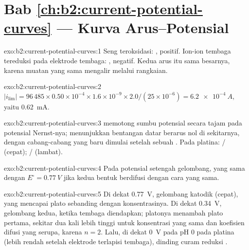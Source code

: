 \section*{Bab \ref{ch:b2:current-potential-curves} --- Kurva Arus--Potensial}

\begin{solution}{exo:b2:current-potential-curves:1}
Seng teroksidasi: , positif. Ion-ion tembaga tereduksi pada
elektrode tembaga: , negatif. Kedua arus itu sama besarnya,
karena muatan yang sama mengalir melalui rangkaian.
\end{solution}

\begin{solution}{exo:b2:current-potential-curves:2}
$|i_{\lim}| = 96\,485 \times 0.50 \times 10^{-4} \times 1.6 \times 10^{-9} \times
2.0/(25 \times 10^{-6}) = \qty{6.2e-4}{A}$, yaitu \qty{0.62}{mA}.
\end{solution}

\begin{solution}{exo:b2:current-potential-curves:3}
 memotong sumbu potensial secara tajam pada potensial
Nernst-nya;  menunjukkan bentangan datar berarus nol di
sekitarnya, dengan cabang-cabang yang baru dimulai setelah sebuah
. Pada platina: / (cepat);
/ (lambat).
\end{solution}

\begin{solution}{exo:b2:current-potential-curves:4}
Pada potensial setengah gelombang, yang sama dengan
$E^\circ = \qty{0.77}{V}$ jika kedua bentuk berdifusi dengan cara yang
sama.
\end{solution}

\begin{solution}{exo:b2:current-potential-curves:5}
Di dekat \qty{0.77}{V}, gelombang katodik  (cepat), yang
mencapai plato sebanding dengan konsentrasinya. Di dekat \qty{0.34}{V},
gelombang kedua, ketika tembaga diendapkan; platonya menambah plato
pertama, sekitar dua kali lebih tinggi untuk konsentrasi yang sama dan
koefisien difusi yang serupa, karena $n = 2$. Lalu, di dekat \qty{0}{V}
pada pH 0 pada platina (lebih rendah setelah elektrode terlapisi tembaga),
dinding curam reduksi .
\end{solution}

